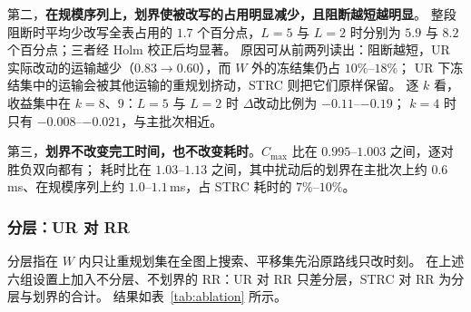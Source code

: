 \documentclass[manuscript,screen,review]{acmart}
\providecommand{\STRC}{\textsc{STRC}}
\begin{document}
第二，\textbf{在规模序列上，划界使被改写的占用明显减少，且阻断越短越明显}。
整段阻断时平均少改写全表占用的 \(1.7\) 个百分点，\(L=5\) 与 \(L=2\) 时分别为 \(5.9\) 与 \(8.2\) 个百分点；三者经 Holm 校正后均显著。
原因可从前两列读出：阻断越短，UR 实际改动的运输越少（\(0.83\to0.60\)），而 \(W\) 外的冻结集仍占 \(10\%\)--\(18\%\)；
UR 下冻结集中的运输会被其他运输的重规划挤动，\STRC{} 则把它们原样保留。
逐 \(k\) 看，收益集中在 \(k=8\)、\(9\)：\(L=5\) 与 \(L=2\) 时 \(\Delta\)改动比例为 \(-0.11\)--\(-0.19\)；
\(k=4\) 时只有 \(-0.008\)--\(-0.021\)，与主批次相近。

第三，\textbf{划界不改变完工时间，也不改变耗时}。\(C_{\max}\) 比在 \(0.995\)--\(1.003\) 之间，逐对胜负双向都有；
耗时比在 \(1.03\)--\(1.13\) 之间，其中扰动后的划界在主批次上约 \(0.6\)\,ms、在规模序列上约 \(1.0\)--\(1.1\)\,ms，占 \STRC{} 耗时的 \(7\%\)--\(10\%\)。

\subsubsection{分层：UR 对 RR}
\label{sec:layering}

分层指在 \(W\) 内只让重规划集在全图上搜索、平移集先沿原路线只改时刻。
在上述六组设置上加入不分层、不划界的 RR：UR 对 RR 只差分层，\STRC{} 对 RR 为分层与划界的合计。
结果如表~\ref{tab:ablation} 所示。
\end{document}

